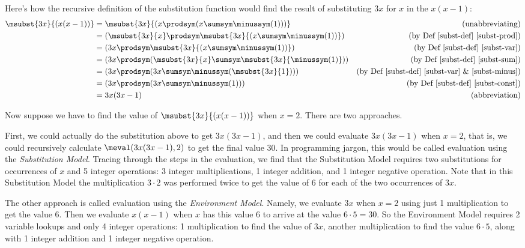 \begin{definition}
\begin{definition}
\begin{itemize}
\begin{enumerate}
\end{enumerate}
\end{itemize}
\end{definition}

Here's how the recursive definition of the substitution function would find
the result of substituting $3x$ for $x$ in the $x(x-1)$:
\begin{align*}
\msubst{3x}{(x(x-1))} & =
\msubst{3x}{(x \prodsym (x \sumsym \minussym(1)))} & \text{(unabbreviating)}\\
 & = (\msubst{3x}{x} \prodsym \msubst{3x}{(x \sumsym \minussym(1))})
         & \text{(by~Def~\ref{subst-def}~\ref{subst-prod})}\\
 & = (3x \prodsym \msubst{3x}{(x \sumsym \minussym(1))})
         & \text{(by~Def~\ref{subst-def}~\ref{subst-var})}\\
 & = (3x \prodsym (\msubst{3x}{x} \sumsym \msubst{3x}{\minussym(1)}))
         & \text{(by~Def~\ref{subst-def}~\ref{subst-sum})}\\
 & = (3x \prodsym (3x \sumsym \minussym (\msubst{3x}{1})))
         & \text{(by~Def~\ref{subst-def}~\ref{subst-var} \&~\ref{subst-minus})}\\
 & = (3x \prodsym (3x \sumsym \minussym (1)))
         & \text{(by~Def~\ref{subst-def}~\ref{subst-const})}\\
 & = 3x(3x-1) & \text{(abbreviation)}
\end{align*}

Now suppose we have to find the value of $\msubst{3x}{(x(x-1))}$ when $x =
2$.  There are two approaches.

First, we could actually do the substitution above to get $3x(3x-1)$, and
then we could evaluate $3x(3x-1)$ when $x =2$, that is, we could
recursively calculate $\meval(3x(3x-1),2)$ to get the final value 30.  In
programming jargon, this would be called evaluation using the
\emph{Substitution Model}.  Tracing through the steps in the evaluation,
we find that the Substitution Model requires two substitutions for
occurrences of $x$ and 5 integer operations: 3 integer multiplications, 1
integer addition, and 1 integer negative operation.  Note that in this
Substitution Model the multiplication $3 \cdot 2$ was performed twice to
get the value of 6 for each of the two occurrences of $3x$.

The other approach is called evaluation using the \emph{Environment
  Model}.  Namely, we evaluate $3x$ when $x = 2$ using just 1
multiplication to get the value 6.  Then we evaluate $x(x-1)$ when $x$ has
this value 6 to arrive at the value $6\cdot 5=30$.  So the Environment
Model requires 2 variable lookups and only 4 integer operations: 1
multiplication to find the value of $3x$, another multiplication to find
the value $6 \cdot 5$, along with 1 integer addition and 1 integer
negative operation.


\end{definition}

